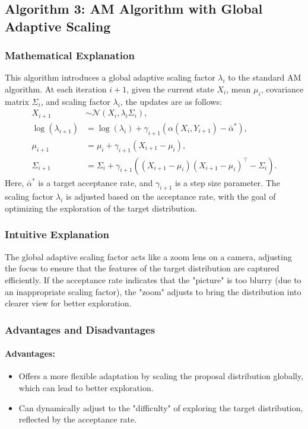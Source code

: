 \documentclass{article}
\begin{document}
\subsection{Algorithm 3: AM Algorithm with Global Adaptive Scaling}

\subsubsection{Mathematical Explanation}
This algorithm introduces a global adaptive scaling factor \(\lambda_i\) to the standard AM algorithm. At each iteration \(i+1\), given the current state \(X_i\), mean \(\mu_i\), covariance matrix \(\Sigma_i\), and scaling factor \(\lambda_i\), the updates are as follows:
\begin{align*}
X_{i+1} &\sim \mathcal{N}(X_i, \lambda_i \Sigma_i), \\
\log(\lambda_{i+1}) &= \log(\lambda_i) + \gamma_{i+1}(\alpha(X_i, Y_{i+1}) - \bar{\alpha}^*), \\
\mu_{i+1} &= \mu_i + \gamma_{i+1}(X_{i+1} - \mu_i), \\
\Sigma_{i+1} &= \Sigma_i + \gamma_{i+1}((X_{i+1} - \mu_i)(X_{i+1} - \mu_i)^\top - \Sigma_i).
\end{align*}
Here, \(\bar{\alpha}^*\) is a target acceptance rate, and \(\gamma_{i+1}\) is a step size parameter. The scaling factor \(\lambda_i\) is adjusted based on the acceptance rate, with the goal of optimizing the exploration of the target distribution.

\subsubsection{Intuitive Explanation}
The global adaptive scaling factor acts like a zoom lens on a camera, adjusting the focus to ensure that the features of the target distribution are captured efficiently. If the acceptance rate indicates that the "picture" is too blurry (due to an inappropriate scaling factor), the "zoom" adjusts to bring the distribution into clearer view for better exploration.

\subsubsection{Advantages and Disadvantages}
\paragraph{Advantages:}
\begin{itemize}
    \item Offers a more flexible adaptation by scaling the proposal distribution globally, which can lead to better exploration.
    \item Can dynamically adjust to the "difficulty" of exploring the target distribution, reflected by the acceptance rate.
\end{itemize}
\end{document}
